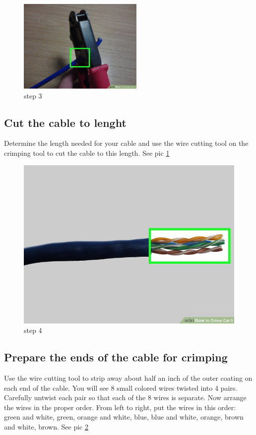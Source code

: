 \documentclass[a4paper,12pt]{book}
\begin{document}
\begin{figure}
\centering
\includegraphics[width= 6cm]{./step3.JPG}
\caption{step 3}\label{fig:step3}
\end{figure}

\subsection{Cut the cable to lenght}
Determine the length needed for your cable and use the wire cutting tool on the crimping tool to cut the cable to this length. See pic \ref{fig:step3}

\begin{figure}
\centering
\includegraphics[width= 13cm]{./step4.JPG}
\caption{step 4}\label{fig:step4}
\end{figure}

\subsection{Prepare the ends of the cable for crimping}
Use the wire cutting tool to strip away about half an inch of the outer coating on each end of the cable. You will see 8 small colored wires twisted into 4 pairs. Carefully untwist each pair so that each of the 8 wires is separate. Now arrange the wires in the proper order. From left to right, put the wires in this order: green and white, green, orange and white, blue, blue and white, orange, brown and white, brown. See pic \ref{fig:step4}
\clearpage 
\end{document}
